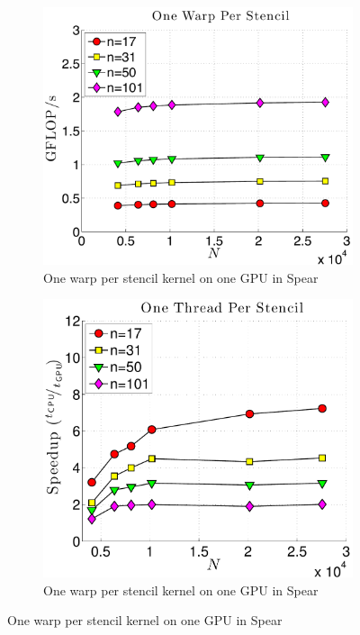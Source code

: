 \begin{figure}
\begin{subfigure}[t]{0.425\textwidth}
\includegraphics[width=1.0\textwidth]{../figures/spear_results/vortex/gflops_gpu_1proc_oneWarpPerStencil.pdf}
\caption{One warp per stencil kernel on one GPU in Spear}
\label{fig:spear_alltoall_1proc_warp}
\end{subfigure} 
\begin{subfigure}[t]{0.425\textwidth}
\includegraphics[width=1.0\textwidth]{../figures/spear_results/vortex/speedup_1proc_oneThreadPerStencil-eps-converted-to.pdf}
\caption{One warp per stencil kernel on one GPU in Spear}
\label{fig:spear_alltoall_1proc_warp}
\end{subfigure} 
\end{figure} 

